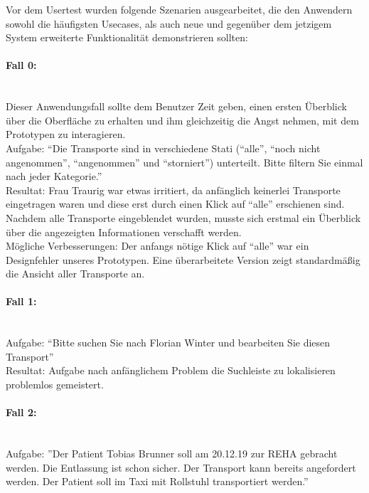 \documentclass[a4paper, ngerman, 12pt]{scrartcl}
\begin{document}
Vor dem Usertest wurden folgende Szenarien ausgearbeitet, die den Anwendern sowohl die häufigsten Usecases, als auch neue und gegenüber dem jetzigem System erweiterte Funktionalität demonstrieren sollten:

\paragraph{Fall 0:}\leavevmode\\
Dieser Anwendungsfall sollte dem Benutzer Zeit geben, einen ersten Überblick über die Oberfläche zu erhalten und ihm gleichzeitig die Angst nehmen, mit dem Prototypen zu interagieren.\\
 
Aufgabe: “Die Transporte sind in verschiedene Stati (“alle”, “noch nicht angenommen”, “angenommen” und “storniert”) unterteilt. Bitte filtern Sie einmal nach jeder Kategorie.”\\
 
Resultat: Frau Traurig war etwas irritiert, da anfänglich keinerlei Transporte eingetragen waren und diese erst durch einen Klick auf “alle” erschienen sind. Nachdem alle Transporte eingeblendet wurden, musste sich erstmal ein Überblick über die angezeigten Informationen verschafft werden.\\
 
Mögliche Verbesserungen: Der anfangs nötige Klick auf “alle” war ein Designfehler unseres Prototypen. Eine überarbeitete Version zeigt standardmäßig die Ansicht aller Transporte an.

\paragraph{Fall 1:}\leavevmode\\
Aufgabe: “Bitte suchen Sie nach Florian Winter und bearbeiten Sie diesen Transport”\\
 
Resultat: Aufgabe nach anfänglichem Problem die Suchleiste zu lokalisieren problemlos gemeistert.

\paragraph{Fall 2:}\leavevmode\\
Aufgabe: ”Der Patient Tobias Brunner soll am 20.12.19 zur REHA gebracht werden. Die Entlassung ist schon sicher. Der Transport kann bereits angefordert werden. Der Patient soll im Taxi mit Rollstuhl transportiert werden.”\\
 
\end{document}
